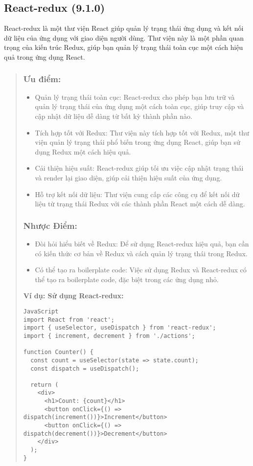 \subsection{React-redux (9.1.0)}

React-redux là một thư viện React giúp quản lý trạng thái ứng dụng và kết nối dữ liệu của ứng dụng với giao diện người dùng. Thư viện này là một phần quan trọng của kiến trúc Redux, giúp bạn quản lý trạng thái toàn cục một cách hiệu quả trong ứng dụng React.

\begin{quote}
\subsubsection{Ưu điểm:}
\begin{itemize}
  \item Quản lý trạng thái toàn cục: React-redux cho phép bạn lưu trữ và quản lý trạng thái của ứng dụng một cách toàn cục, giúp truy cập và cập nhật dữ liệu dễ dàng từ bất kỳ thành phần nào.
  \item Tích hợp tốt với Redux: Thư viện này tích hợp tốt với Redux, một thư viện quản lý trạng thái phổ biến trong ứng dụng React, giúp bạn sử dụng Redux một cách hiệu quả.
  \item Cải thiện hiệu suất: React-redux giúp tối ưu việc cập nhật trạng thái và render lại giao diện, giúp cải thiện hiệu suất của ứng dụng.
  \item Hỗ trợ kết nối dữ liệu: Thư viện cung cấp các công cụ để kết nối dữ liệu từ trạng thái Redux với các thành phần React một cách dễ dàng.
\end{itemize}

\subsubsection{Nhược Điểm:}
\begin{itemize}
  \item Đòi hỏi hiểu biết về Redux: Để sử dụng React-redux hiệu quả, bạn cần có kiến thức cơ bản về Redux và cách quản lý trạng thái trong Redux.
  \item Có thể tạo ra boilerplate code: Việc sử dụng Redux và React-redux có thể tạo ra boilerplate code, đặc biệt trong các ứng dụng nhỏ.
\end{itemize}

\textbf{Ví dụ: Sử dụng React-redux:}
\begin{lstlisting}
JavaScript
import React from 'react';
import { useSelector, useDispatch } from 'react-redux';
import { increment, decrement } from './actions';

function Counter() {
  const count = useSelector(state => state.count);
  const dispatch = useDispatch();

  return (
    <div>
      <h1>Count: {count}</h1>
      <button onClick={() => dispatch(increment())}>Increment</button>
      <button onClick={() => dispatch(decrement())}>Decrement</button>
    </div>
  );
}
\end{lstlisting}
\end{quote}


